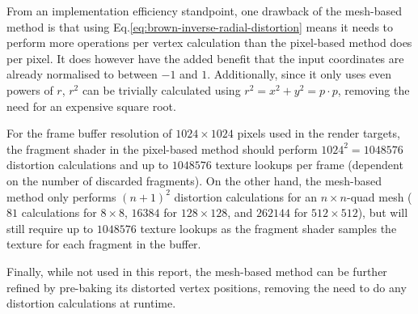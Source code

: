 From an implementation efficiency standpoint, one drawback of the mesh-based method is that using Eq.\ref{eq:brown-inverse-radial-distortion} means it needs to perform more operations per vertex calculation than the pixel-based method does per pixel.
It does however have the added benefit that the input coordinates are already normalised to between $-1$ and $1$.
Additionally, since it only uses even powers of $r$, $r^2$ can be trivially calculated using $r^2 = x^2 + y^2 = p \cdot p$, removing the need for an expensive square root.

For the frame buffer resolution of $1024 \times 1024$ pixels used in the render targets, the fragment shader in the pixel-based method should perform $1024^2 = 1048576$ distortion calculations and up to $1048576$ texture lookups per frame (dependent on the number of discarded fragments).
On the other hand, the mesh-based method only performs $(n + 1)^2$ distortion calculations for an $n \times n$-quad mesh ($81$ calculations for $8 \times 8$, $16384$ for $128 \times 128$, and $262144$ for $512 \times 512$), but will still require up to $1048576$ texture lookups as the fragment shader samples the texture for each fragment in the buffer.

Finally, while not used in this report, the mesh-based method can be further refined by pre-baking its distorted vertex positions, removing the need to do any distortion calculations at runtime.
